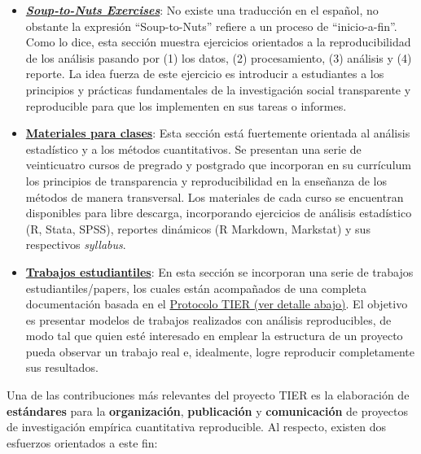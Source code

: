 \documentclass[
  spanish,
  a4paper,
  oneside]{scrbook}
\begin{document}
\begin{itemize}
\item
  \href{https://www.projecttier.org/tier-classroom/soup-nuts-exercises/}{\textbf{\emph{Soup-to-Nuts
  Exercises}}}: No existe una traducción en el español, no obstante la
  expresión ``Soup-to-Nuts'' refiere a un proceso de ``inicio-a-fin''.
  Como lo dice, esta sección muestra ejercicios orientados a la
  reproducibilidad de los análisis pasando por (1) los datos, (2)
  procesamiento, (3) análisis y (4) reporte. La idea fuerza de este
  ejercicio es introducir a estudiantes a los principios y prácticas
  fundamentales de la investigación social transparente y reproducible
  para que los implementen en sus tareas o informes.
\item
  \href{https://www.projecttier.org/tier-classroom/course-materials/}{\textbf{Materiales
  para clases}}: Esta sección está fuertemente orientada al análisis
  estadístico y a los métodos cuantitativos. Se presentan una serie de
  veinticuatro cursos de pregrado y postgrado que incorporan en su
  currículum los principios de transparencia y reproducibilidad en la
  enseñanza de los métodos de manera transversal. Los materiales de cada
  curso se encuentran disponibles para libre descarga, incorporando
  ejercicios de análisis estadístico (R, Stata, SPSS), reportes
  dinámicos (R Markdown, Markstat) y sus respectivos \emph{syllabus}.
\item
  \href{https://www.projecttier.org/tier-classroom/student-work/\#student-papers}{\textbf{Trabajos
  estudiantiles}}: En esta sección se incorporan una serie de trabajos
  estudiantiles/papers, los cuales están acompañados de una completa
  documentación basada en el
  \href{https://www.projecttier.org/tier-protocol/}{Protocolo TIER (ver
  detalle abajo)}. El objetivo es presentar modelos de trabajos
  realizados con análisis reproducibles, de modo tal que quien esté
  interesado en emplear la estructura de un proyecto pueda observar un
  trabajo real e, idealmente, logre reproducir completamente sus
  resultados.
\end{itemize}

Una de las contribuciones más relevantes del proyecto TIER es la
elaboración de \textbf{estándares} para la \textbf{organización},
\textbf{publicación} y \textbf{comunicación} de proyectos de
investigación empírica cuantitativa reproducible. Al respecto, existen
dos esfuerzos orientados a este fin:
\end{document}
